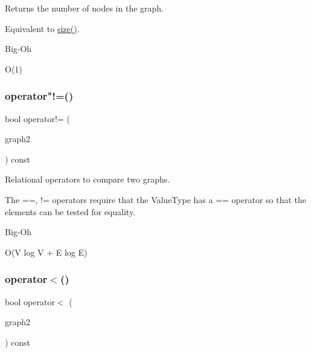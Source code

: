 Returns the number of nodes in the graph. 

Equivalent to \mbox{\hyperlink{classGraph_af9593d4a5ff4274efaf429cb4f9e57cc}{size()}}. \begin{DoxyRefDesc}{Big-\/\+Oh}
\item[\mbox{\hyperlink{BigOh__BigOh000083}{Big-\/\+Oh}}]O(1) \end{DoxyRefDesc}
\mbox{\label{classGraph_aafd8d1cec3a4d6b8cdcb58016e4d093a}} 
\subsubsection{\texorpdfstring{operator"!=()}{operator!=()}}
{\footnotesize\ttfamily bool operator!= (\begin{DoxyParamCaption}\item[{const \mbox{\hyperlink{classGraph}{Graph}}$<$ \mbox{\hyperlink{classVertexGen}{Vertex\+Gen}}$<$ V, E $>$, Edge\+Gen$<$ V, E $>$ $>$ \&}]{graph2 }\end{DoxyParamCaption}) const\hspace{0.3cm}{\ttfamily [inherited]}}



Relational operators to compare two graphs. 

The ==, != operators require that the Value\+Type has a == operator so that the elements can be tested for equality. \begin{DoxyRefDesc}{Big-\/\+Oh}
\item[\mbox{\hyperlink{BigOh__BigOh000094}{Big-\/\+Oh}}]O(V log V + E log E) \end{DoxyRefDesc}
\mbox{\label{classGraph_a1daf423faecc777e29a399812dc39ca2}} 
\subsubsection{\texorpdfstring{operator$<$()}{operator<()}}
{\footnotesize\ttfamily bool operator$<$ (\begin{DoxyParamCaption}\item[{const \mbox{\hyperlink{classGraph}{Graph}}$<$ \mbox{\hyperlink{classVertexGen}{Vertex\+Gen}}$<$ V, E $>$, Edge\+Gen$<$ V, E $>$ $>$ \&}]{graph2 }\end{DoxyParamCaption}) const\hspace{0.3cm}{\ttfamily [inherited]}}



